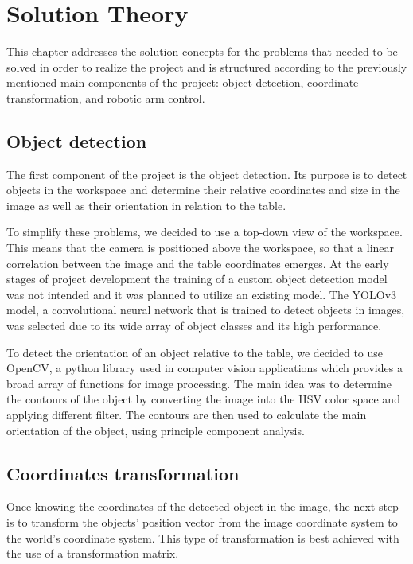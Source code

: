 
\chapter{Solution Theory} %
\label{theory} %


This chapter addresses the solution concepts for the problems that needed to be solved in order to realize the project and is structured according to the previously mentioned main components of the project: object detection, coordinate transformation, and robotic arm control. 
 
\section{Object detection}
The first component of the project is the object detection. Its purpose is to detect objects in the workspace and determine their relative coordinates and size in the image as well as their orientation in relation to the table. 

To simplify these problems, we decided to use a top-down view of the workspace. This means that the camera is positioned above the workspace, so that a linear correlation between the image and the table coordinates emerges. At the early stages of project development the training of a custom object detection model was not intended and it was planned to utilize an existing model. The YOLOv3 model, a convolutional neural network that is trained to detect objects in images, was selected due to its wide array of object classes and its high performance.

To detect the orientation of an object relative to the table, we decided to use OpenCV, a python library used in computer vision applications which provides a broad array of functions for image processing. The main idea was to determine the contours of the object by converting the image into the HSV color space and applying different filter. The contours are then used to calculate the main orientation of the object, using principle component analysis. 

\section{Coordinates transformation}

Once knowing the coordinates of the detected object in the image, 
the next step is to transform the objects' position vector from the image coordinate system to the world's coordinate system. This type of transformation is best achieved with the use of a transformation matrix.


